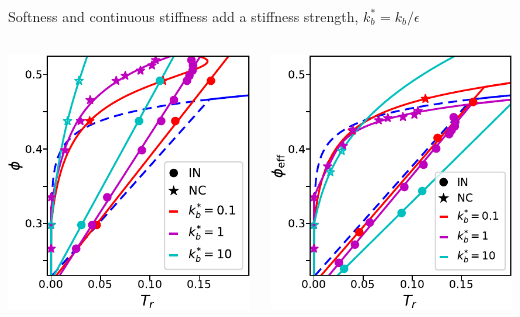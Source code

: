 \documentclass[aspectratio=169]{beamer}
\begin{document}
\begin{frame}[t]{Softness and continuous stiffness add a stiffness strength, $k_{b}^{*} = k_{b}/\epsilon$}
  \centering
  \begin{columns}

    \centering
    \vspace{0.2\baselineskip}

    \includegraphics[]{../figures/ch5_soft/fig-soft_phase_diag_vs_kb/fig-phase_diag_phi_HS.pdf}

    \centering
    \vspace{0.2\baselineskip}

    \includegraphics[]{../figures/ch5_soft/fig-soft_phase_diag_vs_kb/fig-phase_diag_phi_eff.pdf}

  \end{columns}
\end{frame}
\end{document}
